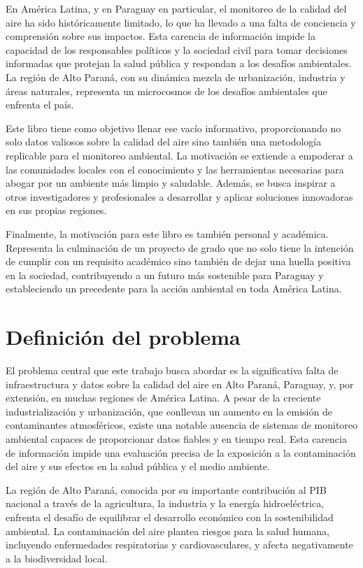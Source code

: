 En América Latina, y en Paraguay en particular, el monitoreo de la calidad del aire ha sido históricamente limitado, lo que ha llevado a una falta de conciencia y comprensión sobre sus impactos. Esta carencia de información impide la capacidad de los responsables políticos y la sociedad civil para tomar decisiones informadas que protejan la salud pública y respondan a los desafíos ambientales. La región de Alto Paraná, con su dinámica mezcla de urbanización, industria y áreas naturales, representa un microcosmos de los desafíos ambientales que enfrenta el país.

Este libro tiene como objetivo llenar ese vacío informativo, proporcionando no solo datos valiosos sobre la calidad del aire sino también una metodología replicable para el monitoreo ambiental. La motivación se extiende a empoderar a las comunidades locales con el conocimiento y las herramientas necesarias para abogar por un ambiente más limpio y saludable. Además, se busca inspirar a otros investigadores y profesionales a desarrollar y aplicar soluciones innovadoras en sus propias regiones.

Finalmente, la motivación para este libro es también personal y académica. Representa la culminación de un proyecto de grado que no solo tiene la intención de cumplir con un requisito académico sino también de dejar una huella positiva en la sociedad, contribuyendo a un futuro más sostenible para Paraguay y estableciendo un precedente para la acción ambiental en toda América Latina.

\section{Definición del problema}

El problema central que este trabajo busca abordar es la significativa falta de infraestructura y datos sobre la calidad del aire en Alto Paraná, Paraguay, y, por extensión, en muchas regiones de América Latina. A pesar de la creciente industrialización y urbanización, que conllevan un aumento en la emisión de contaminantes atmosféricos, existe una notable ausencia de sistemas de monitoreo ambiental capaces de proporcionar datos fiables y en tiempo real. Esta carencia de información impide una evaluación precisa de la exposición a la contaminación del aire y sus efectos en la salud pública y el medio ambiente.

La región de Alto Paraná, conocida por su importante contribución al PIB nacional a través de la agricultura, la industria y la energía hidroeléctrica, enfrenta el desafío de equilibrar el desarrollo económico con la sostenibilidad ambiental. La contaminación del aire plantea riesgos para la salud humana, incluyendo enfermedades respiratorias y cardiovasculares, y afecta negativamente a la biodiversidad local.


